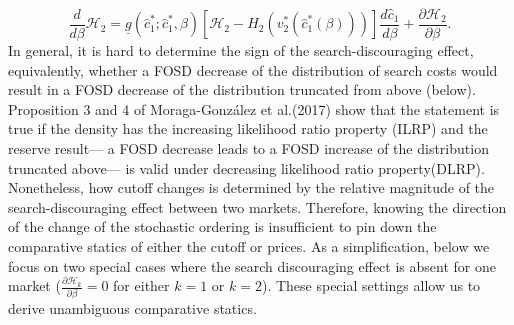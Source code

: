 \documentclass[14pt]{article}
\theoremstyle{plain}
\theoremstyle{definition}
\theoremstyle{remark}
\DeclareRobustCommand\1{\futurelet\oneNext\oneCheck}
\renewcommand{\H}{\mathcal{H}}
\begin{document}
\begin{equation}\label{eq:comparative_P2}
\frac{d}{d \beta}\H_2 = \underline{g}(\hat{c}_1^*;\hat{c}_1^*,\beta)\left[\H_2-H_2(v_2^*(\hat{c}_1^*(\beta))) \right] \frac{d\hat{c}_1}{d\beta}+ \frac{\partial \H_2}{\partial \beta}.
\end{equation}
In general, it is hard to determine the sign of the search-discouraging effect, equivalently, whether a FOSD decrease of the distribution of search costs would result in a FOSD decrease of the distribution truncated from above (below). Proposition 3 and 4 of Moraga-Gonz{\' a}lez et al.(2017) show that the statement is true if the density has the increasing likelihood ratio property (ILRP) and the reserve result--- a FOSD decrease leads to a FOSD increase of the distribution truncated above--- is valid under decreasing likelihood ratio property(DLRP). Nonetheless, how cutoff changes is determined by the relative magnitude of the search-discouraging effect between two markets. Therefore, knowing the direction of the change of the stochastic ordering is insufficient to pin down the comparative statics of either the cutoff or prices. As a simplification, below we focus on two special cases where the search discouraging effect is absent for one market ($\frac{\partial \H_k}{\partial \beta}=0$ for either $k=1$ or $k=2$). These special settings allow us to derive unambiguous comparative statics.
\end{document}
